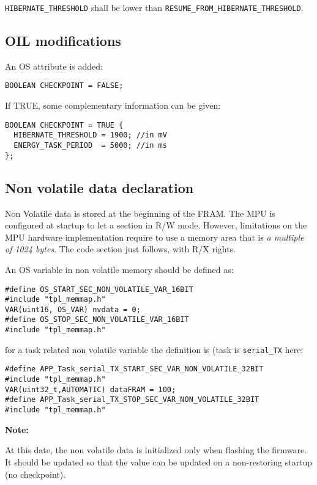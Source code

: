 \documentclass[11pt, oneside]{article}   	%
\begin{document}
\lstinline{HIBERNATE_THRESHOLD} shall be lower than \lstinline{RESUME_FROM_}\-\lstinline{HIBERNATE_THRESHOLD}.

\subsection{OIL modifications}

An OS attribute is added:

\begin{lstlisting}
BOOLEAN CHECKPOINT = FALSE;
\end{lstlisting}

If TRUE, some complementary information can be given:
\begin{lstlisting}
BOOLEAN CHECKPOINT = TRUE {
  HIBERNATE_THRESHOLD = 1900; //in mV
  ENERGY_TASK_PERIOD  = 5000; //in ms
};
\end{lstlisting}

\subsection{Non volatile data declaration}

Non Volatile data is stored at the beginning of the FRAM. The MPU is configured at startup to let a section in R/W mode. However, limitations on the MPU hardware implementation require to use a memory area that is \emph{a multiple of 1024 bytes}. The code section just follows, with R/X rights.

An OS variable in non volatile memory should be defined as:

\begin{lstlisting}
#define OS_START_SEC_NON_VOLATILE_VAR_16BIT
#include "tpl_memmap.h"
VAR(uint16, OS_VAR) nvdata = 0;
#define OS_STOP_SEC_NON_VOLATILE_VAR_16BIT
#include "tpl_memmap.h"
\end{lstlisting}

for a task related non volatile variable the definition is (task is \lstinline{serial_TX} here:

\begin{lstlisting}
#define APP_Task_serial_TX_START_SEC_VAR_NON_VOLATILE_32BIT
#include "tpl_memmap.h"
VAR(uint32_t,AUTOMATIC) dataFRAM = 100;
#define APP_Task_serial_TX_STOP_SEC_VAR_NON_VOLATILE_32BIT
#include "tpl_memmap.h"
\end{lstlisting}

\textbf{Note:}

At this date, the non volatile data is initialized only when flashing the firmware. It should be updated so that the value can be updated on a non-restoring startup (no checkpoint).
\end{document}
